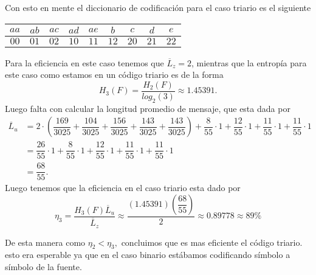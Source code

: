 \begin{sols}
\begin{center}
    \end{center}
Con esto en mente el diccionario de codificación para el caso triario es el siguiente
\begin{center}
  \begin{tabular}{|c|c|c|c|c|c|c|c|c|}
  \hline
$aa$ & $ab$ & $ac$ & $ad$ & $ae$ & $b$ & $c$ & $d$ & $e$\\
\hline
$00$ & $01$ & $02$ & $10$ & $11$ & $12$ & $20$ & $21$ & $22$\\
\hline
 \end{tabular}
 \end{center}
Para la eficiencia en este caso tenemos que $\overline{L}_z=2$, mientras que la entropía para este caso como estamos en un código triario es de la forma
$$H_3(F)=\dfrac{H_2(F)}{log_2(3)}\approx1.45391.$$
Luego falta con calcular la longitud promedio de mensaje, que esta dada por
\begin{align*}
    \overline{L}_u&=2\cdot\left(\dfrac{169}{3025}+\dfrac{104}{3025}+\dfrac{156}{3025}+\dfrac{143}{3025}+\dfrac{143}{3025}\right)+\dfrac{8}{55}\cdot1+\dfrac{12}{55}\cdot1+\dfrac{11}{55}\cdot1+\dfrac{11}{55}\cdot1\\
    &=\dfrac{26}{55}\cdot1+\dfrac{8}{55}\cdot1+\dfrac{12}{55}\cdot1+\dfrac{11}{55}\cdot1+\dfrac{11}{55}\cdot1\\
   &=\dfrac{68}{55}. 
\end{align*}
Luego tenemos que la eficiencia en el caso triario esta dado por
$$\eta_3=\dfrac{H_3(F)\overline{L}_u}{\overline{L}_z}\approx\dfrac{(1.45391)\left(\dfrac{68}{55}\right)}{2}\approx 0.89778\approx 89\%$$

De esta manera como $\eta_2<\eta_3,$ concluimos que es mas eficiente el código triario. esto era esperable ya que en el caso binario estábamos codificando símbolo a símbolo de la fuente.
\end{sols}